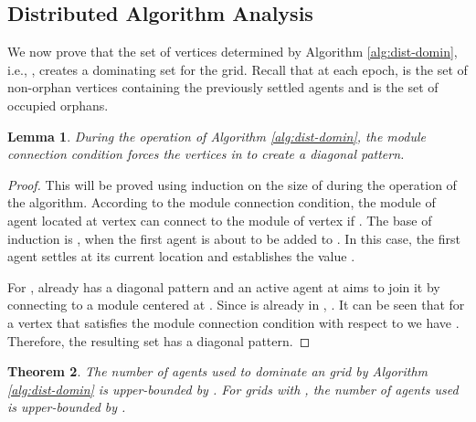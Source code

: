 \documentclass[letterpaper, 10pt, conference]{ieeeconf}
\newtheorem{theorem}{Theorem}[section]
\newtheorem{lemma}[theorem]{Lemma}
\theoremstyle{definition}
\theoremstyle{remark}
\begin{document}
\subsection{Distributed Algorithm Analysis}
\label{subsec:dist-alg-analys}
We now prove that the set of vertices determined by Algorithm \ref{alg:dist-domin}, i.e., , creates a dominating set for the grid. Recall that at each epoch,  is the set of non-orphan vertices containing the previously settled agents and  is the set of occupied orphans.


\begin{lemma}
\label{lem:modules-are-diag}
During the operation of Algorithm \ref{alg:dist-domin}, the module connection condition forces the vertices in  to create a diagonal pattern.
\end{lemma}

\begin{proof}
This will be proved using induction on the size of  during the operation of the algorithm. According to the module connection condition, the module of agent  located at vertex  can connect to the module of vertex  if . The base of induction is , when the first agent is about to be added to . In this case, the first agent settles at its current location  and establishes the value .


For ,  already has a diagonal pattern and an active agent  at  aims to join it by connecting to a module centered at . Since  is already in , . It can be seen that for a vertex  that satisfies the module connection condition with respect to  we have . Therefore, the resulting set has a diagonal pattern.
\end{proof}


\begin{theorem}
\label{theo:error-dist}
The number of agents used to dominate an  grid  by Algorithm \ref{alg:dist-domin} is upper-bounded by . For grids with , the number of agents used is upper-bounded by .
\end{theorem}
\end{document}
